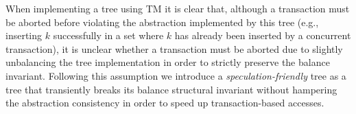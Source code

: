 When implementing a tree using TM it is clear that, although a transaction must be aborted before violating 
the abstraction implemented by this tree
(e.g., inserting $k$ successfully in a set where $k$ has already been inserted by a concurrent transaction),
it is unclear whether a transaction must be aborted due to
slightly unbalancing the tree implementation in order to strictly preserve the balance invariant.
Following this assumption we introduce a \emph{speculation-friendly} tree as a tree that transiently breaks its
balance structural invariant without hampering the abstraction consistency in order to speed up transaction-based accesses. 
% 
% 
% 
